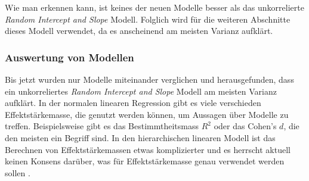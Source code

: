 \documentclass[12pt]{article}\usepackage[]{graphicx}\usepackage[]{color}
\begin{document}
Wie man erkennen kann, ist keines der neuen Modelle besser als das unkorrelierte \textit{Random Intercept and Slope} Modell. Folglich wird für die weiteren Abschnitte dieses Modell verwendet, da es anscheinend am meisten Varianz aufklärt.

\subsubsection{Auswertung von Modellen}
Bis jetzt wurden nur Modelle miteinander verglichen und herausgefunden, dass ein unkorreliertes \textit{Random Intercept and Slope} Modell am meisten Varianz aufklärt. In der normalen linearen Regression gibt es viele verschieden Effektstärkemasse, die genutzt werden können, um Aussagen über Modelle zu treffen. Beispielsweise gibt es das Bestimmtheitsmass $R^2$ oder das Cohen's $d$, die den meisten ein Begriff sind. In den hierarchischen linearen Modell ist das Berechnen von Effektstärkemassen etwas komplizierter und es herrscht aktuell keinen Konsens darüber, was für Effektstärkemasse genau verwendet werden sollen \citep{PEUGH201085,SnijdersTomA.B2012Ma:a}. 
\end{document}
